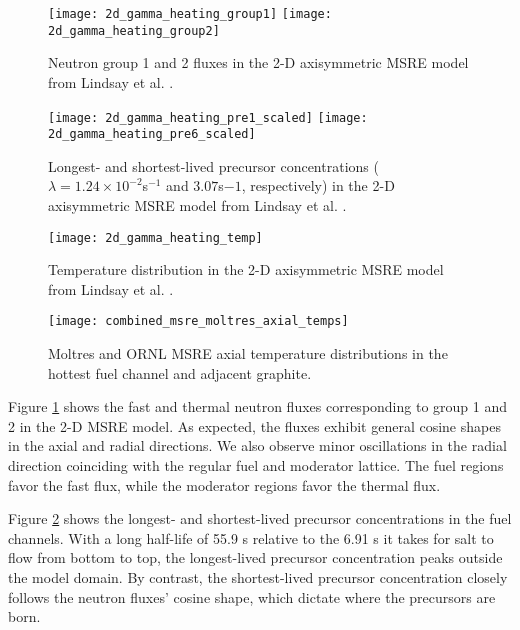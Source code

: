 \begin{figure}[htb!]
	\centering
	\texttt{[image: 2d\_gamma\_heating\_group1]}
	\texttt{[image: 2d\_gamma\_heating\_group2]}
	\caption{Neutron group 1 and 2 fluxes in the 2-D axisymmetric \gls{MSRE}
	model from Lindsay et al. \cite{lindsay_introduction_2018}.}
	\label{fig:msre-flux}
\end{figure}

\begin{figure}[htb!]
	\centering
	\texttt{[image: 2d\_gamma\_heating\_pre1\_scaled]}
	\texttt{[image: 2d\_gamma\_heating\_pre6\_scaled]}
	\caption{Longest- and shortest-lived precursor concentrations ($\lambda =
	1.24\times 10^{-2}$s$^{-1}$ and $3.07$s${-1}$, respectively) in the 2-D
	axisymmetric \gls{MSRE} model from Lindsay et al.
	\cite{lindsay_introduction_2018}.}
	\label{fig:msre-precursor}
\end{figure}

\begin{figure}[htb!]
	\centering
	\begin{minipage}[b]{0.45\columnwidth}
	    \texttt{[image: 2d\_gamma\_heating\_temp]}
	    \caption{Temperature distribution in the 2-D
	    axisymmetric \gls{MSRE} model from Lindsay et al.
	    \cite{lindsay_introduction_2018}.}
	    \label{fig:msre-temp}
	\end{minipage}
	\hfill
	\begin{minipage}[b]{0.45\columnwidth}
	    \texttt{[image: combined\_msre\_moltres\_axial\_temps]}
	    \caption{Moltres \cite{lindsay_introduction_2018} and \gls{ORNL}
	    \gls{MSRE} \cite{briggs_molten-salt_1964} axial temperature
	    distributions in the hottest fuel channel and adjacent graphite.}
	    \label{fig:msre-temp-plot}
	\end{minipage}
\end{figure}

Figure \ref{fig:msre-flux} shows the fast and thermal neutron fluxes
corresponding to group 1 and 2 in the 2-D \gls{MSRE} model. As expected, the
fluxes exhibit general cosine shapes in the axial and radial directions. We
also observe minor oscillations in the radial direction coinciding with the
regular fuel and moderator lattice. The fuel regions favor the fast flux, while
the moderator regions favor the thermal flux.

Figure \ref{fig:msre-precursor}
shows the longest- and shortest-lived precursor concentrations in the fuel
channels. With a long half-life of 55.9 s relative to the 6.91 s it takes for
salt to flow from bottom to top, the longest-lived precursor concentration peaks
outside the model domain. By contrast, the shortest-lived precursor
concentration closely follows the neutron fluxes' cosine shape, which
dictate where the precursors are born.


